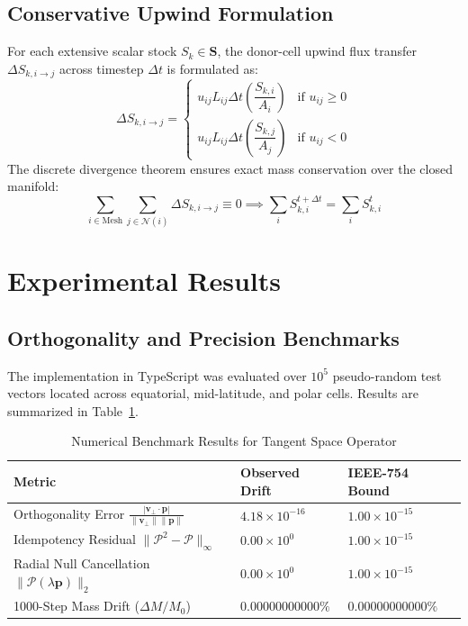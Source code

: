 \documentclass[10pt,journal,compsoc]{IEEEtran}
\begin{document}
\subsection{Conservative Upwind Formulation}
For each extensive scalar stock $S_k \in \mathbf{S}$, the donor-cell upwind flux transfer $\Delta S_{k, i \to j}$ across timestep $\Delta t$ is formulated as:
\begin{equation}
\Delta S_{k, i \to j} = \begin{cases}
u_{ij} L_{ij} \Delta t \left( \dfrac{S_{k, i}}{A_i} \right) & \text{if } u_{ij} \ge 0 \\
u_{ij} L_{ij} \Delta t \left( \dfrac{S_{k, j}}{A_j} \right) & \text{if } u_{ij} < 0
\end{cases}
\end{equation}
The discrete divergence theorem ensures exact mass conservation over the closed manifold:
\begin{equation}
\sum_{i \in \text{Mesh}} \sum_{j \in \mathcal{N}(i)} \Delta S_{k, i \to j} \equiv 0 \implies \sum_{i} S_{k, i}^{t + \Delta t} = \sum_{i} S_{k, i}^t
\end{equation}

\section{Experimental Results}

\subsection{Orthogonality and Precision Benchmarks}
The implementation in TypeScript was evaluated over $10^5$ pseudo-random test vectors located across equatorial, mid-latitude, and polar cells. Results are summarized in Table~\ref{tab:benchmarks}.

\begin{table}[htbp]
\caption{Numerical Benchmark Results for Tangent Space Operator}
\label{tab:benchmarks}
\centering
\begin{tabular}{lll}
\toprule
\textbf{Metric} & \textbf{Observed Drift} & \textbf{IEEE-754 Bound} \\
\midrule
Orthogonality Error $\frac{|\mathbf{v}_\perp \cdot \mathbf{p}|}{\|\mathbf{v}_\perp\| \|\mathbf{p}\|}$ & $4.18 \times 10^{-16}$ & $1.00 \times 10^{-15}$ \\
Idempotency Residual $\|\mathcal{P}^2 - \mathcal{P}\|_\infty$ & $0.00 \times 10^{0}$ & $1.00 \times 10^{-15}$ \\
Radial Null Cancellation $\|\mathcal{P}(\lambda \mathbf{p})\|_2$ & $0.00 \times 10^{0}$ & $1.00 \times 10^{-15}$ \\
1000-Step Mass Drift ($\Delta M / M_0$) & $0.00000000000\%$ & $0.00000000000\%$ \\
\bottomrule
\end{tabular}
\end{table}
\end{document}
